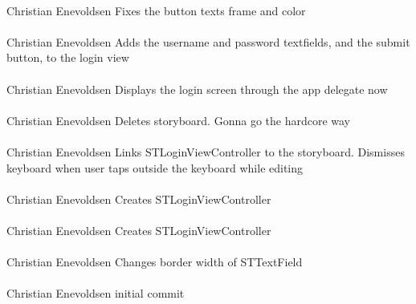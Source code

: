 \documentclass[12pt]{article}
\begin{document}
\paragraph{}Christian Enevoldsen	Fixes the button texts frame and color
\paragraph{}Christian Enevoldsen	Adds the username and password textfields, and the submit button, to the login view
\paragraph{}Christian Enevoldsen	Displays the login screen through the app delegate now
\paragraph{}Christian Enevoldsen	Deletes storyboard. Gonna go the hardcore way
\paragraph{}Christian Enevoldsen	Links STLoginViewController to the storyboard. Dismisses keyboard when user taps outside the keyboard while editing
\paragraph{}Christian Enevoldsen	Creates STLoginViewController
\paragraph{}Christian Enevoldsen	Creates STLoginViewController
\paragraph{}Christian Enevoldsen	Changes border width of STTextField
\paragraph{}Christian Enevoldsen	initial commit
\end{document}
